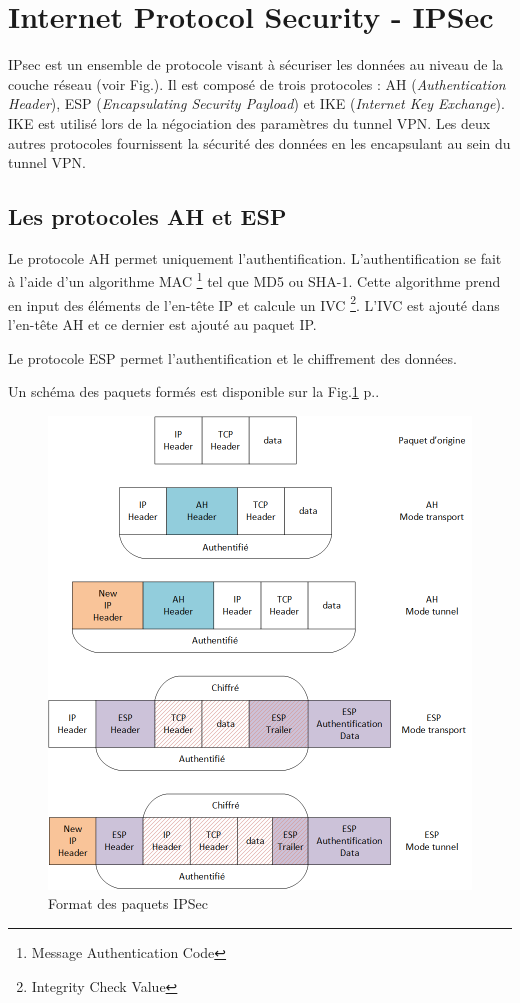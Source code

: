 \section{Internet Protocol Security - IPSec}
IPsec est un ensemble de protocole visant à sécuriser les données au niveau de la couche réseau (voir Fig.). 
Il est composé de trois protocoles : AH (\textit{Authentication Header}), ESP (\textit{Encapsulating Security Payload}) et IKE (\textit{Internet Key Exchange}).
IKE est utilisé lors de la négociation des paramètres du tunnel VPN. 
Les deux autres protocoles fournissent la sécurité des données en les encapsulant au sein du tunnel VPN. 

\subsection{Les protocoles AH et ESP}
Le protocole AH permet uniquement l'authentification. 
L'authentification se fait à l'aide d'un algorithme MAC \footnote{Message Authentication Code} tel que MD5 ou SHA-1.
Cette algorithme prend en input des éléments de l'en-tête IP et calcule un IVC \footnote{Integrity Check Value}.
L'IVC est ajouté dans l'en-tête AH et ce dernier est ajouté au paquet IP.

Le protocole ESP permet l'authentification et le chiffrement des données.

Un schéma des paquets formés est disponible sur la Fig.\ref{fig:ipsecHead} p.\pageref{fig:ipsecHead}.

\begin{figure}[ht]
	\centering
	\includegraphics[width=16cm]{techno/IPSec-AH-ESP}
	\caption{Format des paquets IPSec}
	\label{fig:ipsecHead}
\end{figure}

